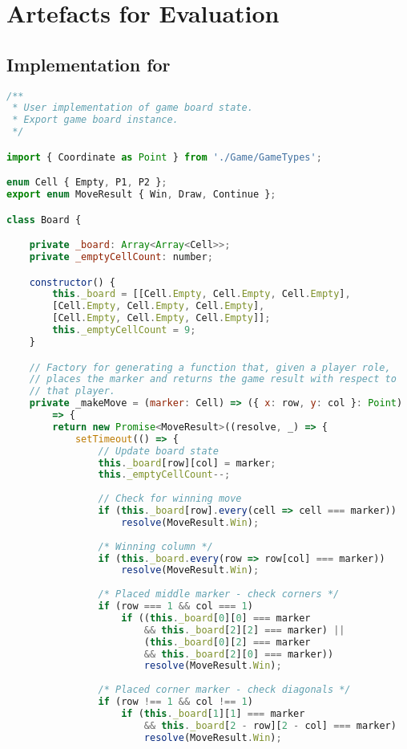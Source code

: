 \chapter{Artefacts for Evaluation}
\label{chapter:evalcode}

\section{Implementation for }
\label{section:evalcodegame}

\begin{lstlisting}[language=javascript,tabsize=2]
/**
 * User implementation of game board state.
 * Export game board instance.
 */

import { Coordinate as Point } from './Game/GameTypes';

enum Cell { Empty, P1, P2 };
export enum MoveResult { Win, Draw, Continue };

class Board {

	private _board: Array<Array<Cell>>;
	private _emptyCellCount: number;

	constructor() {
		this._board = [[Cell.Empty, Cell.Empty, Cell.Empty],
		[Cell.Empty, Cell.Empty, Cell.Empty],
		[Cell.Empty, Cell.Empty, Cell.Empty]];
		this._emptyCellCount = 9;
	}

	// Factory for generating a function that, given a player role,
	// places the marker and returns the game result with respect to 
	// that player.
	private _makeMove = (marker: Cell) => ({ x: row, y: col }: Point) 
		=> {
		return new Promise<MoveResult>((resolve, _) => {
			setTimeout(() => {
				// Update board state
				this._board[row][col] = marker;
				this._emptyCellCount--;
		
				// Check for winning move
				if (this._board[row].every(cell => cell === marker))
					resolve(MoveResult.Win);
		
				/* Winning column */
				if (this._board.every(row => row[col] === marker))
					resolve(MoveResult.Win);
		
				/* Placed middle marker - check corners */
				if (row === 1 && col === 1) 
					if ((this._board[0][0] === marker 
						&& this._board[2][2] === marker) ||
						(this._board[0][2] === marker 
						&& this._board[2][0] === marker))
						resolve(MoveResult.Win);
						
				/* Placed corner marker - check diagonals */
				if (row !== 1 && col !== 1) 
					if (this._board[1][1] === marker 
						&& this._board[2 - row][2 - col] === marker)
						resolve(MoveResult.Win);
		

\end{lstlisting}
